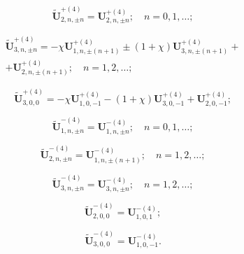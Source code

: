 \begin{equation}\label{eq:1:92b}
\mathbf{\tilde U}_{2,n,\pm n}^{+(4)}=\mathbf{U}_{2,n,\pm n}^{+(4)};\quad n=0,1,\dots;
\end{equation}

\begin{multline}\label{eq:1:93b}
\mathbf{\tilde U}_{3,n,\pm n}^{+(4)}=-\chi\mathbf{U}_{1,n,\pm (n+1)}^{+(4)}\pm(1+\chi)\mathbf{U}_{3,n,\pm (n+1)}^{+(4)}+ \\
+\mathbf{U}_{2,n,\pm (n+1)}^{+(4)};\quad n=1,2,\dots;
\end{multline}

\begin{equation}\label{eq:1:94b}
\mathbf{\tilde U}_{3,0,0}^{+(4)}=-\chi\mathbf{U}_{1,0,-1}^{+(4)}-(1+\chi)\mathbf{U}_{3,0,-1}^{+(4)}+\mathbf{U}_{2,0,-1}^{+(4)};
\end{equation}

\begin{equation}\label{eq:1:95b}
\mathbf{\tilde U}_{1,n,\pm n}^{-(4)}=\mathbf{U}_{1,n,\pm n}^{-(4)};\quad n=0,1,\dots;
\end{equation}

\begin{equation}\label{eq:1:96b}
\mathbf{\tilde U}_{2,n,\pm n}^{-(4)}=\mathbf{U}_{1,n,\pm (n+1)}^{-(4)};\quad n=1,2,\dots;
\end{equation}

\begin{equation}\label{eq:1:97b}
\mathbf{\tilde U}_{3,n,\pm n}^{-(4)}=\mathbf{U}_{3,n,\pm n}^{-(4)};\quad n=1,2,\dots;
\end{equation}

\begin{equation}\label{eq:1:98b}
\mathbf{\tilde U}_{2,0,0}^{-(4)}=\mathbf{U}_{1,0,1}^{-(4)};
\end{equation}

\begin{equation}\label{eq:1:99b}
\mathbf{\tilde U}_{3,0,0}^{-(4)}=\mathbf{U}_{1,0,-1}^{-(4)}.
\end{equation}

